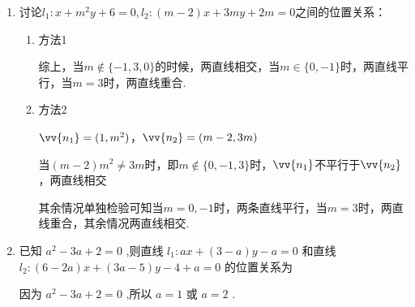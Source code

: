 \begin{enumerate}
    \item 讨论$l_1: x+m^2y+6=0, l_2: (m-2)x+3my+2m=0$之间的位置关系：
    \begin{jieda}
        \begin{enumerate}
            \item 方法1

            综上，当$m \notin \{-1, 3, 0\}$的时候，两直线相交，当$m \in \{0, -1\}$时，两直线平行，当$m = 3$时，两直线重合.

            \item 方法2

            $\vv{n_1} = (1, m^2)$，$\vv{n_2} = (m-2, 3m)$

            当$(m-2)m^2 \neq 3m$时，即$m \notin \{0, -1, 3\}$时，$\vv{n_1}$不平行于$\vv{n_2}$，两直线相交

            其余情况单独检验可知当$m = 0,-1$时，两条直线平行，当$m = 3$时，两直线重合，其余情况两直线相交.
        \end{enumerate}
    \end{jieda}
    \item 已知 ${a}^{2} - {3a} + 2 = 0$ ,则直线 ${l}_{1} : {ax} + \left( {3 - a}\right) y - a = 0$ 和直线 ${l}_{2} : \left( {6 - {2a}}\right) x + \left( {{3a} - 5}\right) y - 4 + a = 0$ 的位置关系为
    \begin{jieda}
        因为 ${a}^{2} - {3a} + 2 = 0$ ,所以 $a = 1$ 或 $a = 2$ .
    \end{jieda}


\end{enumerate}
